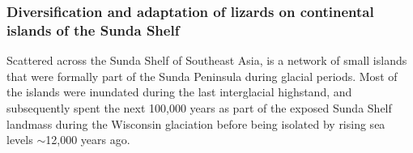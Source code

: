 
\subsubsection*{Diversification and adaptation of lizards on continental islands
of the Sunda Shelf}
Scattered across the Sunda Shelf of Southeast Asia, is a network of small
islands that were formally part of the Sunda Peninsula during glacial periods.
Most of the islands were inundated during the last interglacial highstand, and
subsequently spent the next 100,000 years as part of the exposed Sunda Shelf
landmass during the Wisconsin glaciation before being isolated by rising sea
levels $\sim$12,000 years ago.

